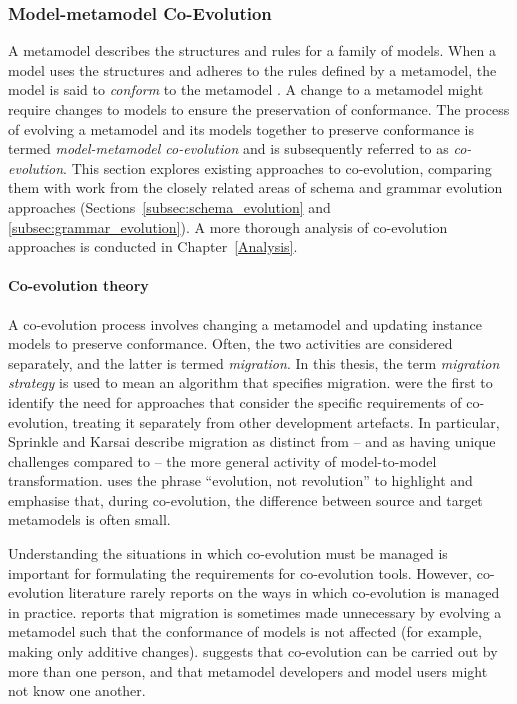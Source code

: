 \subsubsection{Model-metamodel Co-Evolution}
\label{LitReview:ModelCoEvo}
A metamodel describes the structures and rules for a family of models. When a model uses the structures and adheres to the rules defined by a metamodel, the model is said to \emph{conform} to the metamodel \cite{bezivin05unification}. A change to a metamodel might require changes to models to ensure the preservation of conformance. The process of evolving a metamodel and its models together to preserve conformance is termed \emph{model-metamodel co-evolution} and is subsequently referred to as \emph{co-evolution}. This section explores existing approaches to co-evolution, comparing them with work from the closely related areas of schema and grammar evolution approaches (Sections~\ref{subsec:schema_evolution} and \ref{subsec:grammar_evolution}). A more thorough analysis of co-evolution approaches is conducted in Chapter~\ref{Analysis}.

\paragraph{Co-evolution theory}
A co-evolution process involves changing a metamodel and updating instance models to preserve conformance. Often, the two activities are considered separately, and the latter is termed \emph{migration}. In this thesis, the term \emph{migration strategy} is used to mean an algorithm that specifies migration. \cite{sprinkle04domain} were the first to identify the need for approaches that consider the specific requirements of co-evolution, treating it separately from other development artefacts. In particular, Sprinkle and Karsai describe migration as distinct from -- and as having unique challenges compared to -- the more general activity of model-to-model transformation. \cite{sprinkle03thesis} uses the phrase ``evolution, not revolution'' to highlight and emphasise that, during co-evolution, the difference between source and target metamodels is often small.

Understanding the situations in which co-evolution must be managed is important for formulating the requirements for co-evolution tools. However, co-evolution literature rarely reports on the ways in which co-evolution is managed in practice. \cite{herrmannsdoerfer09cope} reports that migration is sometimes made unnecessary by evolving a metamodel such that the conformance of models is not affected (for example, making only additive changes). \cite{cicchetti08automating} suggests that co-evolution can be carried out by more than one person, and that metamodel developers and model users might not know one another. 

